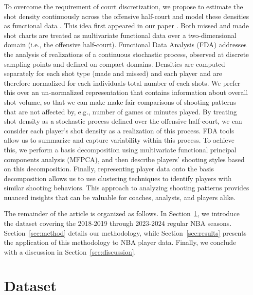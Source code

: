 \documentclass[USenglish]{article}
\theoremstyle{dgthm}
\theoremstyle{dgdef}
\begin{document}
To overcome the requirement of court discretization, we propose to estimate the shot density continuously across the offensive half-court and model these densities as functional data \citep{ramsayFunctionalDataAnalysis2005,kokoszkaIntroductionFunctionalData2017}.
This idea first appeared in our paper \cite{golovkineUseGramMatrix2024}. Both missed and made shot charts are treated as multivariate functional data over a two-dimensional domain (i.e., the offensive half-court). Functional Data Analysis (FDA) addresses the analysis of realizations of a continuous stochastic process, observed at discrete sampling points and defined on compact domains. 
Densities are computed separately for each shot type (made and missed) and each player and are therefore normalized for each individuals total number of each shots.
We prefer this over an un-normalized representation that contains information about overall shot volume, so that we can make make fair comparisons of shooting
patterns that are not affected by, e.g., number of games or minutes played.
By treating shot density as a stochastic process defined over the offensive half-court, we can consider each player’s shot density as a realization of this process. FDA tools allow us to summarize and capture variability within this process. To achieve this, we perform a basis decomposition using multivariate functional principal components analysis (MFPCA), and then describe players’ shooting styles based on this decomposition. Finally, representing player data onto the basis decomposition allows us to use clustering techniques to identify players with similar shooting behaviors. This approach to analyzing shooting patterns provides nuanced insights that can be valuable for coaches, analysts, and players alike.


The remainder of the article is organized as follows. In Section~\ref{sec:dataset}, we introduce the dataset covering the 2018-2019 through 2023-2024 regular NBA seasons. Section~\ref{sec:method} details our methodology, while Section~\ref{sec:results} presents the application of this methodology to NBA player data. Finally, we conclude with a discussion in Section~\ref{sec:discussion}.



\section{Dataset} %
\label{sec:dataset}
\end{document}
